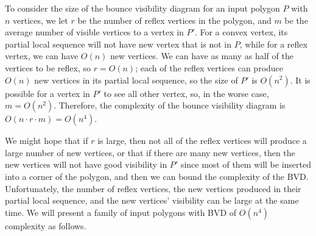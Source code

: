 \documentclass[]{styles/svproc}  %
\begin{document}
To consider the size of the bounce visibility diagram for an input polygon $P$
with $n$ vertices, we let $r$ be the number of reflex vertices in the polygon,
and $m$ be the average number of visible vertices to a vertex in $P'$. For a
convex vertex, its partial local sequence will not have new vertex that is not
in $P$, while for a reflex vertex, we can have $O(n)$ new vertices. We can have
as many as half of the vertices to be reflex, so $r = O(n)$; each of the reflex
vertices can produce $O(n)$ new vertices in its partial local sequence, so the
size of $P'$ is $O(n^2)$. It is possible for a vertex in $P'$ to see all other
vertex, so, in the worse case, $m = O(n^2)$. Therefore, the complexity of the
bounce visibility diagram is $O(n\cdot r\cdot m) = O(n^4)$.

We might hope that if $r$ is large, then not all of the reflex vertices will
produce a large number of new vertices, or that if there are many new vertices,
then the new vertices will not have good visibility in $P'$ since most of them
will be inserted into a corner of the polygon, and then we can bound the
complexity of the BVD. Unfortunately, the number of reflex vertices, the new
vertices produced in their partial local sequence, and the new vertices'
visibility can be large at the same time. We will present a family of input
polygons with BVD of $O(n^4)$ complexity as follows.
\end{document}
